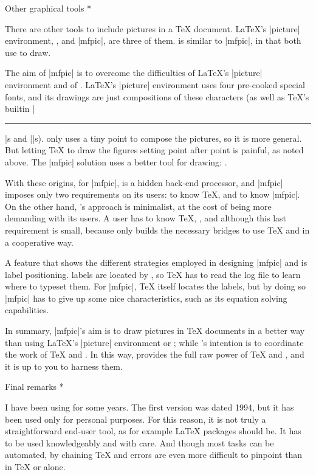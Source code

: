 \head * Other graphical tools *

There are other tools to include pictures in a {\TeX} document.
{\LaTeX}'s |picture| environment, {\PiCTeX}, and |mfpic|, are three of
them. {\MTeX} is similar to |mfpic|, in that both use {\MF} to draw.

The aim of |mfpic| is to overcome the difficulties of {\LaTeX}'s
|picture| environment and of {\PiCTeX}. {\LaTeX}'s |picture| environment
uses four pre-cooked special fonts, and its drawings are just
compositions of these characters (as well as {\TeX}'s builtin |\hrule|s and
|\vrule|s). {\PiCTeX} only uses a tiny point to compose the pictures, so
it is more general. But letting {\TeX} to draw the figures setting point
after point is painful, as noted above. The |mfpic| solution uses a
better tool for drawing: {\MF}.

With these origins, for |mfpic|, {\MF} is a hidden back-end processor,
and |mfpic| imposes only two requirements on its users: to know {\TeX},
and to know |mfpic|. On the other hand, {\MTeX}'s approach is
minimalist, at the cost of being more demanding with its users.  A
{\MTeX} user has to know {\TeX}, {\MF}, and {\MTeX}\Dash although this
last requirement is small, because {\MTeX} only builds the necessary
bridges to use {\TeX} and {\MF} in a cooperative way.

A feature that shows the different strategies employed in designing
|mfpic| and {\MTeX} is label positioning. {\MTeX} labels are located by
{\MF}, so {\TeX} has to read the {\MF} log file to learn where to
typeset them. For |mfpic|, {\TeX} itself locates the labels,
but by doing so |mfpic| has to give up some nice {\MF} characteristics,
such as its equation solving capabilities.

In summary, |mfpic|'s aim is to draw pictures in {\TeX} documents in a
better way than using {\LaTeX}'s |picture| environment or {\PiCTeX};
while {\MTeX}'s intention is to coordinate the work of {\TeX} and
{\MF}. In this way, {\MTeX} provides the full raw power of {\TeX} and
{\MF}, and it is up to you to harness them.


\head * Final remarks *

I have been using {\MTeX} for some years.  The first version was dated
1994, but it has been used only for personal purposes. For this reason,
it is not truly a straightforward end-user tool, as for example {\LaTeX} packages
should be.  It has to be used knowledgeably and with care. And though
most tasks can be automated, by chaining {\TeX} and {\MF} errors are
even more difficult to pinpoint than in {\TeX} or {\MF} alone.

